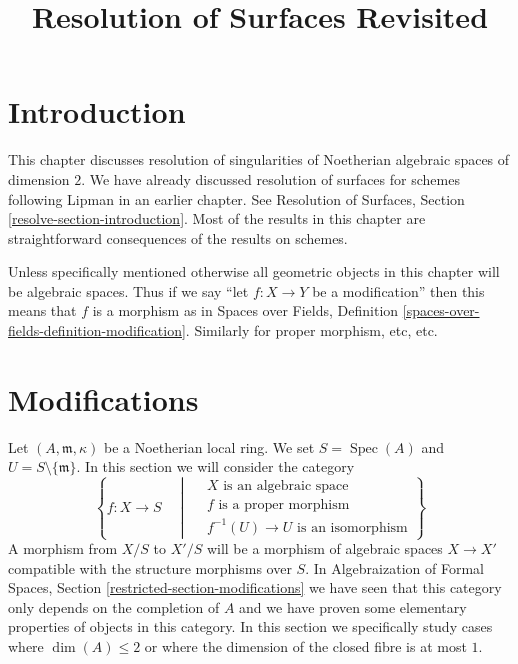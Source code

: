 \documentclass{stacks-project}
\theoremstyle{plain}
\theoremstyle{definition}
\theoremstyle{remark}
\numberwithin{equation}{subsection}
\def\Spec{\mathop{\mathrm{Spec}}}
\begin{document}
\title{Resolution of Surfaces Revisited}


\maketitle

\label{section-phantom}

\tableofcontents

\section{Introduction}
\label{section-introduction}

\noindent
This chapter discusses resolution of singularities of
Noetherian algebraic spaces of dimension $2$.
We have already discussed resolution of surfaces
for schemes following Lipman \cite{Lipman} in an earlier
chapter. See
Resolution of Surfaces, Section \ref{resolve-section-introduction}.
Most of the results in this chapter are straightforward
consequences of the results on schemes.

\medskip\noindent
Unless specifically mentioned otherwise all geometric objects
in this chapter will be algebraic spaces. Thus if we say
``let $f : X \to Y$ be a modification'' then this means that
$f$ is a morphism as in Spaces over Fields, Definition
\ref{spaces-over-fields-definition-modification}.
Similarly for proper morphism, etc, etc.










\section{Modifications}
\label{section-modifications}

\noindent
Let $(A, \mathfrak m, \kappa)$ be a Noetherian local ring. We set
$S = \Spec(A)$ and $U = S \setminus \{\mathfrak m\}$. In this section
we will consider the category
\begin{equation}
\label{equation-modification}
\left\{
f : X \longrightarrow S
\quad \middle| \quad
\begin{matrix}
X\text{ is an algebraic space}\\
f\text{ is a proper morphism}\\
f^{-1}(U) \to U\text{ is an isomorphism}
\end{matrix}
\right\}
\end{equation}
A morphism from $X/S$ to $X'/S$ will be a morphism of algebraic spaces
$X \to X'$ compatible with the structure morphisms over $S$. In
Algebraization of Formal Spaces, Section \ref{restricted-section-modifications}
we have seen that this category only depends on the completion of $A$
and we have proven some elementary properties of objects in this category.
In this section we specifically study cases where
$\dim(A) \leq 2$ or where the dimension of the closed fibre is at most $1$.
\end{document}

